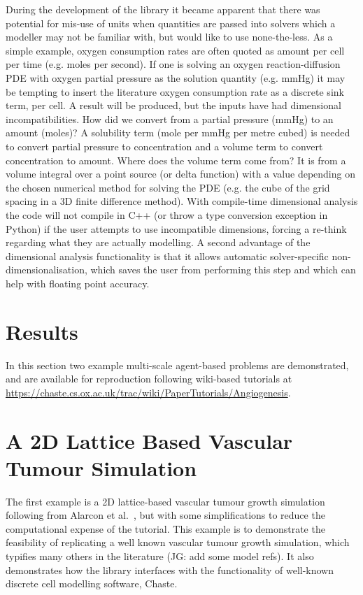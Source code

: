 \documentclass[10pt,letterpaper]{article}
\begin{document}
During the development of the library it became apparent that there was potential for mis-use of units when quantities are passed into solvers which a modeller may not be familiar with, but would like to use none-the-less. As a simple example, oxygen consumption rates are often quoted as amount per cell per time (e.g. moles per second). If one is solving an oxygen reaction-diffusion PDE with oxygen partial pressure as the solution quantity (e.g. mmHg) it may be tempting to insert the literature oxygen consumption rate as a discrete sink term, per cell. A result will be produced, but the inputs have had dimensional incompatibilities. How did we convert from a partial pressure (mmHg) to an amount (moles)? A solubility term (mole per mmHg per metre cubed) is needed to convert partial pressure to concentration and a volume term to convert concentration to amount. Where does the volume term come from? It is from a volume integral over a point source (or delta function) with a value depending on the chosen numerical method for solving the PDE (e.g. the cube of the grid spacing in a 3D finite difference method). With compile-time dimensional analysis the code will not compile in C++ (or throw a type conversion exception in Python) if the user attempts to use incompatible dimensions, forcing a re-think regarding what they are actually modelling. A second advantage of the dimensional analysis functionality is that it allows automatic solver-specific non-dimensionalisation, which saves the user from performing this step and which can help with floating point accuracy.

\section*{Results}

In this section two example multi-scale agent-based problems are demonstrated, and are available for reproduction following wiki-based tutorials at \url{https://chaste.cs.ox.ac.uk/trac/wiki/PaperTutorials/Angiogenesis}.

\section*{A 2D Lattice Based Vascular Tumour Simulation}

The first example is a 2D lattice-based vascular tumour growth simulation following from Alarcon et al.~\cite{Alarcon2005}, but with some simplifications to reduce the computational expense of the tutorial. This example is to demonstrate the feasibility of replicating a well known vascular tumour growth simulation, which typifies many others in the literature (JG: add some model refs). It also demonstrates how the library interfaces with the functionality of well-known discrete cell modelling software, Chaste.
\end{document}
